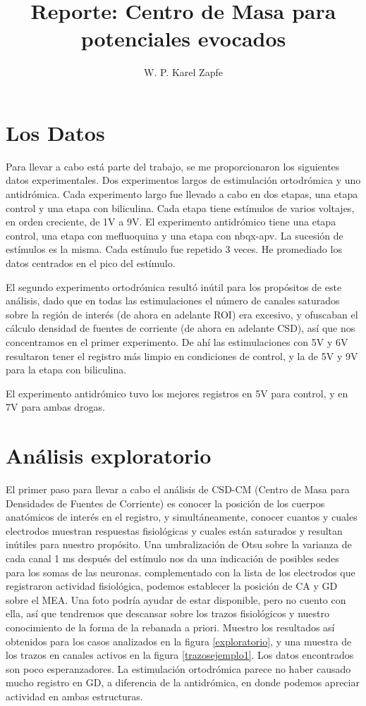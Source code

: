 \documentclass{article}
\title{Reporte: Centro de Masa para potenciales evocados}
\author{W. P. Karel Zapfe}
\begin{document}
\maketitle

\section{Los Datos}

Para llevar a cabo está parte del trabajo, se me proporcionaron
los siguientes datos experimentales.
Dos experimentos largos de estimulación ortodrómica y uno
antidrómica. Cada experimento largo fue llevado a cabo
en dos etapas, una etapa control y una etapa con biliculina.
Cada etapa tiene estímulos de varios voltajes, en orden creciente,
de 1V a 9V.
El experimento antidrómico tiene una etapa control, una etapa con
mefluoquina y una etapa con nbqx-apv. La sucesión de estímulos es la misma.
Cada estímulo fue repetido 3 veces. He promediado los datos
centrados en el pico del estímulo. 

El segundo experimento ortodrómica resultó inútil para los propósitos
de este análisis, dado que en todas las estimulaciones el número de
canales saturados sobre la región de interés (de ahora en adelante ROI)
era excesivo, y ofuscaban el cálculo densidad de fuentes de corriente
(de ahora en adelante CSD), así que nos concentramos en el primer experimento.
De ahí las estimulaciones con 5V y 6V resultaron tener el registro más
limpio en condiciones de control, y la de 5V y 9V para la etapa
con biliculina.

El experimento antidrómico tuvo los mejores registros en 5V para control,
y en 7V para ambas drogas. 

\section{Análisis exploratorio}

El primer paso para llevar a cabo el análisis de CSD-CM (Centro de Masa
para Densidades de Fuentes de Corriente) es conocer la posición de
los cuerpos anatómicos de interés en el registro, y simultáneamente,
conocer cuantos y cuales electrodos muestran respuestas fisiológicas y
cuales están saturados y resultan inútiles para nuestro propósito.
Una umbralización de Otsu sobre la varianza de cada canal 1 ms después del
estímulo nos da una indicación de posibles sedes para los somas de las neuronas.
complementado con la lista de los electrodos que registraron actividad fisiológica, podemos establecer la posición de CA y GD sobre el MEA. Una foto
podría ayudar de estar disponible, pero no cuento con ella, así que
tendremos que descansar sobre los trazos fisiológicos y nuestro
conocimiento de la forma de la rebanada a priori. Muestro
los resultados así obtenidos para los casos analizados en la figura \ref{exploratorio},
y una muestra de los trazos en canales activos en la figura \ref{trazosejemplo1}.
Los datos encontrados son poco esperanzadores. La estimulación ortodrómica parece
no haber causado mucho registro en GD, a diferencia de la antidrómica, en donde
podemos apreciar actividad en ambas estructuras.
\end{document}
